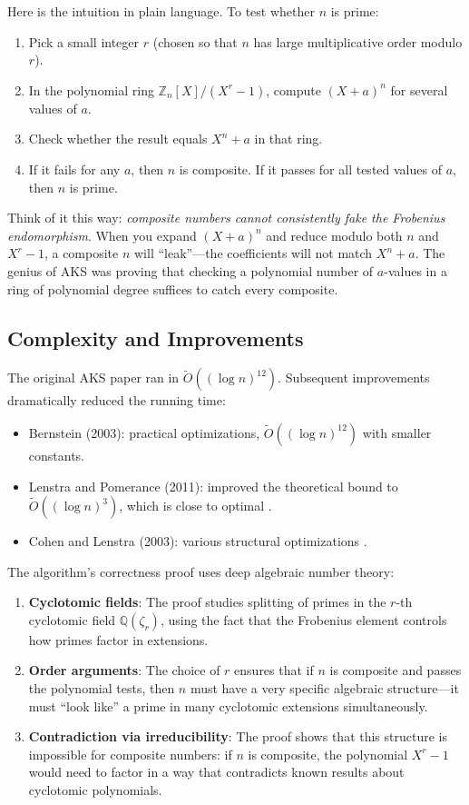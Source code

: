 Here is the intuition in plain language. To test whether $n$ is prime:

\begin{enumerate}
\item Pick a small integer $r$ (chosen so that $n$ has large multiplicative order modulo $r$).
\item In the polynomial ring $\mathbb{Z}_n[X] / (X^r - 1)$, compute $(X + a)^n$ for several values of $a$.
\item Check whether the result equals $X^n + a$ in that ring.
\item If it fails for any $a$, then $n$ is composite. If it passes for all tested values of $a$, then $n$ is prime.
\end{enumerate}

Think of it this way: \emph{composite numbers cannot consistently fake the Frobenius endomorphism}. When you expand $(X+a)^n$ and reduce modulo both $n$ and $X^r - 1$, a composite $n$ will ``leak''---the coefficients will not match $X^n + a$. The genius of AKS was proving that checking a polynomial number of $a$-values in a ring of polynomial degree suffices to catch every composite.

\subsection{Complexity and Improvements}

The original AKS paper ran in $\tilde{O}((\log n)^{12})$. Subsequent improvements dramatically reduced the running time:

\begin{itemize}
\item Bernstein (2003): practical optimizations, $\tilde{O}((\log n)^{12})$ with smaller constants.
\item Lenstra and Pomerance (2011): improved the theoretical bound to $\tilde{O}((\log n)^3)$, which is close to optimal \cite{lenstra2011}.
\item Cohen and Lenstra (2003): various structural optimizations \cite{bernstein2006}.
\end{itemize}

The algorithm's correctness proof uses deep algebraic number theory:

\begin{enumerate}
\item \textbf{Cyclotomic fields}: The proof studies splitting of primes in the $r$-th cyclotomic field $\mathbb{Q}(\zeta_r)$, using the fact that the Frobenius element controls how primes factor in extensions.
\item \textbf{Order arguments}: The choice of $r$ ensures that if $n$ is composite and passes the polynomial tests, then $n$ must have a very specific algebraic structure---it must ``look like'' a prime in many cyclotomic extensions simultaneously.
\item \textbf{Contradiction via irreducibility}: The proof shows that this structure is impossible for composite numbers: if $n$ is composite, the polynomial $X^r - 1$ would need to factor in a way that contradicts known results about cyclotomic polynomials.
\end{enumerate}

